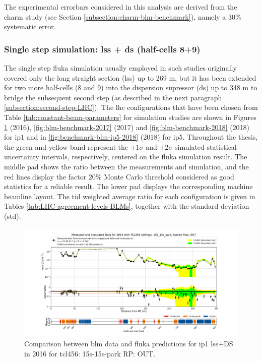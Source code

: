 \documentclass[encoding=utf8,british]{tumphthesis}
\begin{document}
The experimental errorbars considered in this analysis are derived from the \acrshort{charm} study (see Section \ref{subsection:charm-blm-benchmark}), namely a 30\% systematic error.

\subsubsection{Single step simulation: \acrshort{lss} + \acrshort{ds} (half-cells 8+9)}

The single step \acrshort{fluka} simulation usually employed in such studies originally covered only the long straight section (\acrshort{lss}) up to 269 m, but it has been extended for two more half-cells (8 and 9) into the dispersion supressor (\acrshort{ds}) up to 348 m to bridge the subsequent second step (as described in the next paragraph \ref{subsection:second-step-LHC}). The \acrshort{lhc} configurations that have been chosen from Table \ref{tab:constant-beam-parameters} for simulation studies are shown in Figures \ref{fig:blm-benchmark-2016} (2016), \ref{fig:blm-benchmark-2017} (2017) and \ref{fig:blm-benchmark-2018} (2018) for \acrshort{ip}1 and in \ref{fig:benchmark-blm-ip5-2018} (2018) for \acrshort{ip}5. Throughout the thesis, the green and yellow band represent the $\pm1\sigma$ and $\pm2\sigma$ simulated statistical uncertainty intervals, respectively, centered on the \acrshort{fluka} simulation result. The middle pad shows the ratio between the measurements and simulation, and the red lines display the factor 20\% Monte Carlo threshold considered as good statistics for a reliable result. The lower pad displays the corresponding machine beamline layout. The \acrshort{tid} weighted average ratio for each configuration is given in Tables \ref{tab:LHC-agreement-levels-BLMs}, together with the standard deviation (\acrshort{std}).


\begin{figure}[H]
    \centering
    \includegraphics[width=0.9\linewidth]{results/benchmark_2016_15s_15s_park_final.png}
    \caption{Comparison between \acrshort{blm} data and \acrshort{fluka} predictions for \acrshort{ip}1 \acrshort{lss}+DS in 2016 for \acrshort{tcl}456: 15s-15s-park RP: OUT.}
    \label{fig:blm-benchmark-2016}
\end{figure}
\end{document}
